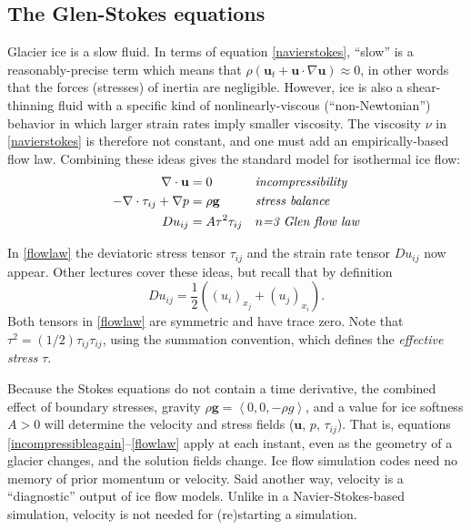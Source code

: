 \documentclass[letterpaper,final,12pt,reqno]{amsart}
\newcommand{\bu}{\mathbf{u}}
\begin{document}
\subsection*{The Glen-Stokes equations}  Glacier ice is a slow fluid.  In terms of equation \eqref{navierstokes}, ``slow'' is a reasonably-precise term which means that $\rho \left(\mathbf{u}_t + \mathbf{u}\cdot\nabla \mathbf{u}\right) \approx 0$, in other words that the forces (stresses) of inertia are negligible.  However, ice is also a shear-thinning fluid with a specific kind of nonlinearly-viscous (``non-Newtonian'') behavior in which larger strain rates imply smaller viscosity.  The viscosity $\nu$ in \eqref{navierstokes} is therefore not constant, and one must add an empirically-based flow law.  Combining these ideas gives the standard model for isothermal ice flow:
\begin{align}
\nabla \cdot \mathbf{u} &= 0 &&\text{\emph{incompressibility}} \label{incompressibleagain} \\
- \nabla \cdot \tau_{ij} + \nabla p &= \rho \mathbf{g} &&\text{\emph{stress balance}} \label{forcebalance} \\
Du_{ij} &= A \tau^2 \tau_{ij} &&\text{\emph{$n$=3 Glen flow law}} \label{flowlaw}
\end{align}

In \eqref{flowlaw} the deviatoric stress tensor $\tau_{ij}$ and the strain rate tensor $Du_{ij}$ now appear.  Other lectures cover these ideas, but recall that by definition
    $$Du_{ij} = \frac{1}{2} \left((u_i)_{x_j}+(u_j)_{x_i}\right).$$
Both tensors in \eqref{flowlaw} are symmetric and have trace zero.  Note that $\tau^2 = (1/2) \tau_{ij} \tau_{ij}$, using the summation convention, which defines the \emph{effective stress} $\tau$.

Because the Stokes equations do not contain a time derivative, the combined effect of boundary stresses, gravity $\rho \mathbf{g} = \left<0,0,-\rho g\right>$, and a value for ice softness $A>0$ will determine the velocity and stress fields ($\bu$, $p$, $\tau_{ij}$).  That is, equations \eqref{incompressibleagain}--\eqref{flowlaw} apply at each instant, even as the geometry of a glacier changes, and the solution fields change.  Ice flow simulation codes need no memory of prior momentum or velocity.  Said another way, velocity is a ``diagnostic'' output of ice flow models.  Unlike in a Navier-Stokes-based simulation, velocity is not needed for (re)starting a simulation.
\end{document}
